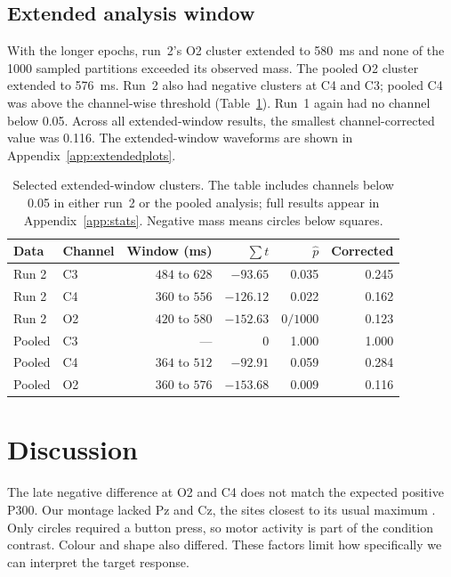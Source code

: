 \documentclass[11pt,a4paper]{article}
\begin{document}
\subsection{Extended analysis window}

With the longer epochs, run~2's O2 cluster extended to 580~ms and none of the
1000 sampled partitions exceeded its observed mass. The pooled O2 cluster
extended to 576~ms. Run~2 also had negative clusters at C4 and C3; pooled C4
was above the channel-wise threshold (Table~\ref{tab:extended}). Run~1 again
had no channel below 0.05. Across all extended-window results, the smallest
channel-corrected value was 0.116. The extended-window waveforms are shown in
Appendix~\ref{app:extendedplots}.

\begin{table}[H]
  \centering
  \caption{Selected extended-window clusters. The table includes channels
  below 0.05 in either run~2 or the pooled analysis; full results appear in
  Appendix~\ref{app:stats}. Negative mass means circles below squares.}
  \label{tab:extended}
  \small
  \begin{tabular}{llrrrr}
    \toprule
    Data & Channel & Window (ms) & $\sum t$ & $\hat p$ & Corrected \\
    \midrule
    Run 2 & C3 & $484$ to $628$ & $-93.65$ & 0.035 & 0.245 \\
    Run 2 & C4 & $360$ to $556$ & $-126.12$ & 0.022 & 0.162 \\
    Run 2 & O2 & $420$ to $580$ & $-152.63$ & $0/1000$ & 0.123 \\
    Pooled & C3 & --- & 0 & 1.000 & 1.000 \\
    Pooled & C4 & $364$ to $512$ & $-92.91$ & 0.059 & 0.284 \\
    Pooled & O2 & $360$ to $576$ & $-153.68$ & 0.009 & 0.116 \\
    \bottomrule
  \end{tabular}
\end{table}

\section{Discussion}

The late negative difference at O2 and C4 does not match the expected positive
P300. Our montage lacked Pz and Cz, the sites closest to its usual maximum
\cite{polich}. Only circles required a button press, so motor activity is
part of the condition contrast. Colour and shape also differed. These
factors limit how specifically we can interpret the target response.
\end{document}
